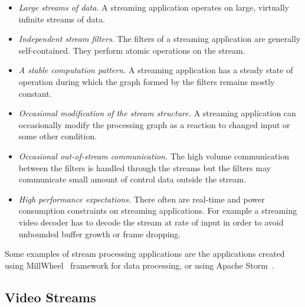 \begin{itemize}
    \item \textit{Large streams of data.} A streaming application operates on large, virtually infinite streams of data.
    \item \textit{Independent stream filters.} The filters of a streaming application are generally self-contained. They perform atomic operations on the stream.
    \item \textit{A stable computation pattern.} A streaming application has a steady state of operation during which the graph formed by the filters remains mostly constant.
    \item \textit{Occasional modification of the stream structure.} A streaming application can occasionally modify the processing graph as a reaction to changed input or some other condition.
    \item \textit{Occasional out-of-stream communication.} The high volume communication between the filters is handled through the streams but the filters may communicate small amount of control data outside the stream.
    \item \textit{High performance expectations.} There often are real-time and power consumption constraints on streaming applications. For example a streaming video decoder has to decode the stream at rate of input in order to avoid unbounded buffer growth or frame dropping.
\end{itemize}

Some examples of stream processing applications are the applications created using MillWheel~\cite{tyler2013millwheel} framework for data processing, or using Apache Storm~\cite{storm2014storm}. 

\subsection{Video Streams}
